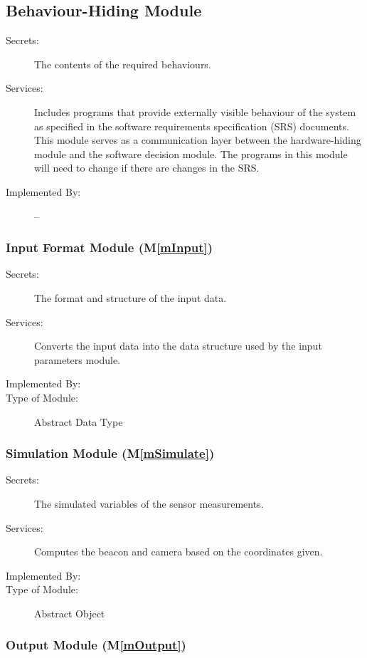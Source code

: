 \documentclass[12pt, titlepage]{article}
\newcommand{\mref}[1]{M\ref{#1}}
\begin{document}
\subsection{Behaviour-Hiding Module}

\begin{description}
\item[Secrets:]The contents of the required behaviours.
\item[Services:]Includes programs that provide externally visible behaviour of
  the system as specified in the software requirements specification (SRS)
  documents. This module serves as a communication layer between the
  hardware-hiding module and the software decision module. The programs in this
  module will need to change if there are changes in the SRS.
\item[Implemented By:] --
\end{description}

\subsubsection{Input Format Module (\mref{mInput})}

\begin{description}
\item[Secrets:]The format and structure of the input data.
\item[Services:]Converts the input data into the data structure used by the
  input parameters module.
\item[Implemented By:] \progname
\item[Type of Module:] Abstract Data Type
\end{description}

\subsubsection{Simulation Module (\mref{mSimulate})}

\begin{description}
\item[Secrets:]The simulated variables of the sensor measurements.
\item[Services:]Computes the beacon and camera based on the coordinates given.
\item[Implemented By:] \progname
\item[Type of Module:] Abstract Object
\end{description}

\subsubsection{Output Module (\mref{mOutput})}
\end{document}
